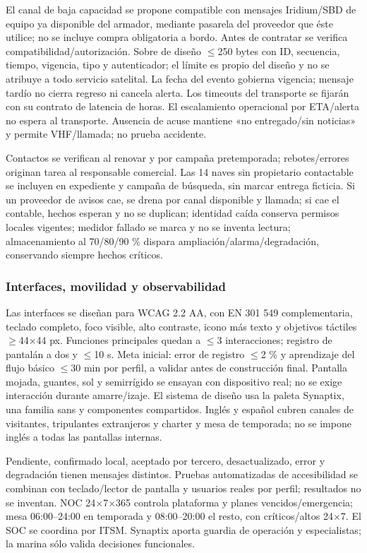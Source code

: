 \documentclass[11pt,letterpaper]{report}
\begin{document}
El canal de baja capacidad se propone compatible con mensajes Iridium/SBD de equipo ya disponible del armador, mediante pasarela del proveedor que éste utilice; no se incluye compra obligatoria a bordo. Antes de contratar se verifica compatibilidad/autorización. Sobre de diseño $\leq$250 bytes con ID, secuencia, tiempo, vigencia, tipo y autenticador; el límite es propio del diseño y no se atribuye a todo servicio satelital. La fecha del evento gobierna vigencia; mensaje tardío no cierra regreso ni cancela alerta. Los timeouts del transporte se fijarán con su contrato de latencia de horas. El escalamiento operacional por ETA/alerta no espera al transporte. Ausencia de acuse mantiene «no entregado/sin noticias» y permite VHF/llamada; no prueba accidente.

Contactos se verifican al renovar y por campaña pretemporada; rebotes/errores originan tarea al responsable comercial. Las 14 naves sin propietario contactable se incluyen en expediente y campaña de búsqueda, sin marcar entrega ficticia. Si un proveedor de avisos cae, se drena por canal disponible y llamada; si cae el contable, hechos esperan y no se duplican; identidad caída conserva permisos locales vigentes; medidor fallado se marca y no se inventa lectura; almacenamiento al 70/80/90 \% dispara ampliación/alarma/degradación, conservando siempre hechos críticos.

\subsubsection*{Interfaces, movilidad y observabilidad}
Las interfaces se diseñan para WCAG 2.2 AA, con EN 301 549 complementaria, teclado completo, foco visible, alto contraste, icono más texto y objetivos táctiles $\geq$44$\times$44 px. Funciones principales quedan a $\leq$3 interacciones; registro de pantalán a dos y $\leq$10 s. Meta inicial: error de registro $\leq$2 \% y aprendizaje del flujo básico $\leq$30 min por perfil, a validar antes de construcción final. Pantalla mojada, guantes, sol y semirrígido se ensayan con dispositivo real; no se exige interacción durante amarre/izaje. El sistema de diseño usa la paleta Synaptix, una familia sans y componentes compartidos. Inglés y español cubren canales de visitantes, tripulantes extranjeros y charter y mesa de temporada; no se impone inglés a todas las pantallas internas.

Pendiente, confirmado local, aceptado por tercero, desactualizado, error y degradación tienen mensajes distintos. Pruebas automatizadas de accesibilidad se combinan con teclado/lector de pantalla y usuarios reales por perfil; resultados no se inventan. NOC 24$\times$7$\times$365 controla plataforma y planes vencidos/emergencia; mesa 06:00--24:00 en temporada y 08:00--20:00 el resto, con críticos/altos 24$\times$7. El SOC se coordina por ITSM. Synaptix aporta guardia de operación y especialistas; la marina sólo valida decisiones funcionales.
\end{document}
